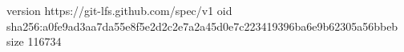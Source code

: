version https://git-lfs.github.com/spec/v1
oid sha256:a0fe9ad3aa7da55e8f5e2d2c2e7a2a45d0e7c223419396ba6e9b62305a56bbeb
size 116734
